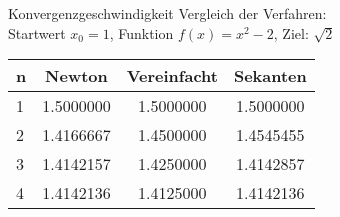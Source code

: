 \begin{example2}{Konvergenzgeschwindigkeit} Vergleich der Verfahren:
    \vspace{1mm}\\
    Startwert $x_0 = 1$, Funktion $f(x) = x^2 - 2$, Ziel: $\sqrt{2}$
    \begin{center}
    \begin{tabular}{l|c|c|c}
    n & Newton & Vereinfacht & Sekanten \\\hline
    1 & 1.5000000 & 1.5000000 & 1.5000000\\
    2 & 1.4166667 & 1.4500000 & 1.4545455\\
    3 & 1.4142157 & 1.4250000 & 1.4142857\\
    4 & 1.4142136 & 1.4125000 & 1.4142136
    \end{tabular}
    \end{center}
\end{example2}

